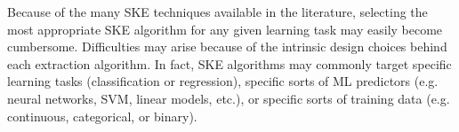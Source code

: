 \documentclass[
]{ceurart}
\begin{document}
Because of the many SKE techniques available in the literature, selecting the most appropriate SKE algorithm for any given learning task may easily become cumbersome.
%
Difficulties may arise because of the intrinsic design choices behind each extraction algorithm.
%
In fact, SKE algorithms may commonly target specific learning tasks (classification or regression), specific sorts of ML predictors (e.g. neural networks, SVM, linear models, etc.), or specific sorts of training data (e.g. continuous, categorical, or binary).
%
%
\end{document}
